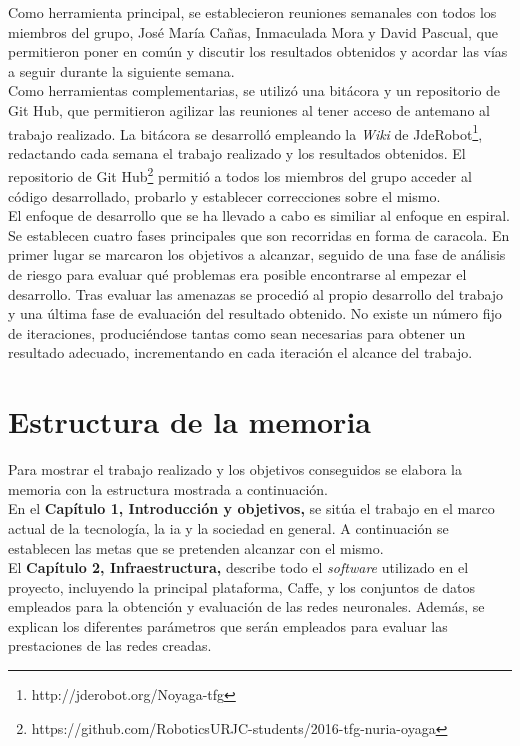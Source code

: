 Como herramienta principal, se establecieron reuniones semanales con todos los miembros del grupo, José María Cañas, Inmaculada Mora y David Pascual, que permitieron poner en común y discutir los resultados obtenidos y acordar las vías a seguir durante la siguiente semana.\\

Como herramientas complementarias, se utilizó una bitácora y un repositorio de Git Hub, que permitieron agilizar las reuniones al tener acceso de antemano al trabajo realizado. La bitácora se desarrolló empleando la \textit{Wiki} de JdeRobot\footnote{http://jderobot.org/Noyaga-tfg}, redactando cada semana el trabajo realizado y los resultados obtenidos. El repositorio de Git Hub\footnote{https://github.com/RoboticsURJC-students/2016-tfg-nuria-oyaga} permitió a todos los miembros del grupo acceder al código desarrollado, probarlo y establecer correcciones sobre el mismo.\\

El enfoque de desarrollo que se ha llevado a cabo es similiar al enfoque en espiral. Se establecen cuatro fases principales que son recorridas en forma de caracola. En primer lugar se marcaron los objetivos a alcanzar, seguido de una fase de análisis de riesgo para evaluar qué problemas era posible encontrarse al empezar el desarrollo. Tras evaluar las amenazas se procedió al propio desarrollo del trabajo y una última fase de evaluación del resultado obtenido. No existe un número fijo de iteraciones, produciéndose tantas como sean necesarias para obtener un resultado adecuado, incrementando en cada iteración el alcance del trabajo.

\section{Estructura de la memoria}
Para mostrar el trabajo realizado y los objetivos conseguidos se elabora la memoria con la estructura mostrada a continuación.\\

En el \textbf{Capítulo 1, Introducción y objetivos,} se sitúa el trabajo en el marco actual de la tecnología, la \acrshort{ia} y la sociedad en general. A continuación se establecen las metas que se pretenden alcanzar con el mismo.\\

El \textbf{Capítulo 2, Infraestructura,} describe todo el \textit{software} utilizado en el proyecto, incluyendo la principal plataforma, Caffe, y los conjuntos de datos empleados para la obtención y evaluación de las redes neuronales. Además, se explican los diferentes parámetros que serán empleados para evaluar las prestaciones de las redes creadas.\\

